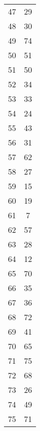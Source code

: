 \begin{table}
\begin{tabular}{c c }
47 & 29 \\
48 & 30 \\
49 & 74 \\
50 & 51 \\
51 & 50 \\
52 & 34 \\
53 & 33 \\
54 & 24 \\
55 & 43 \\
56 & 31 \\
57 & 62 \\
58 & 27 \\
59 & 15 \\
60 & 19 \\
61 & 7 \\
62 & 57 \\
63 & 28 \\
64 & 12 \\
65 & 70 \\
66 & 35 \\
67 & 36 \\
68 & 72 \\
69 & 41 \\
70 & 65 \\
71 & 75 \\
72 & 68 \\
73 & 26 \\
74 & 49 \\
75 & 71 \\
\hline
\end{tabular}
\end{table}